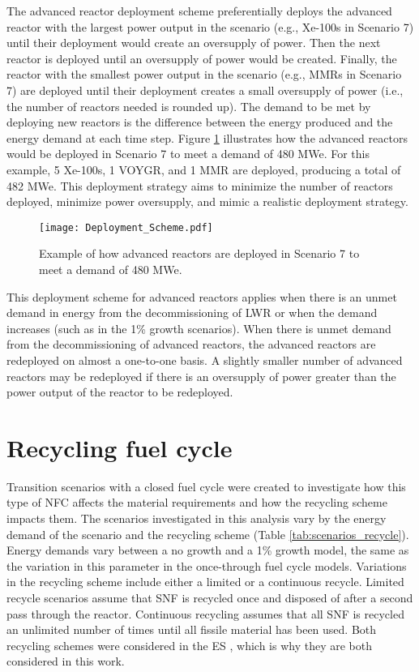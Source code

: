The advanced reactor deployment scheme
preferentially deploys the advanced reactor with the largest power 
output in the scenario (e.g., Xe-100s in Scenario 7) until their 
deployment would create an oversupply of power. Then the next reactor 
is deployed until an oversupply of power would be created. Finally, the 
reactor 
with the smallest power output in the scenario (e.g., \glspl{MMR} in 
Scenario 7) are deployed until their deployment creates a small oversupply 
of power (i.e., the number of reactors needed is rounded up). The demand 
to be met by deploying new reactors is the difference between the energy 
produced and the energy demand at each time step. 
Figure \ref{fig:AR_deployment} illustrates how the advanced reactors 
would be deployed in Scenario 7 to meet a demand of 480 MWe. For this 
example, 5 Xe-100s, 1 VOYGR, and 1 \gls{MMR} are deployed, producing a 
total of 482 MWe. This deployment 
strategy aims to minimize the number of reactors deployed,  
minimize power oversupply, and mimic a realistic deployment strategy.

\begin{figure}[ht]
    \centering
    \texttt{[image: Deployment\_Scheme.pdf]}
    \caption{Example of how advanced reactors are deployed in Scenario 7 
    to meet a demand of 480 MWe.}
    \label{fig:AR_deployment}
\end{figure}

This deployment scheme for advanced reactors applies when there is an 
unmet demand in energy from the decommissioning of \gls{LWR} or 
when the demand increases (such as in the 1\% growth scenarios). When 
there is unmet demand from the decommissioning of advanced reactors, the 
advanced reactors are redeployed on almost a one-to-one basis. A slightly
smaller number of advanced reactors may be redeployed if there is an 
oversupply of power greater than the power output of the reactor to be 
redeployed. 

\section{Recycling fuel cycle}
Transition scenarios with a closed fuel cycle were created
to investigate how this type of \gls{NFC} affects the material requirements 
and how the recycling scheme impacts them. 
The scenarios investigated in this analysis vary by the 
energy demand of the scenario and the recycling scheme (Table 
\ref{tab:scenarios_recycle}). Energy demands vary 
between a no growth and a 1\% growth model, the same as the variation in this 
parameter in the once-through fuel cycle models. Variations in the recycling 
scheme include either a limited or a continuous recycle. Limited recycle 
scenarios assume that \gls{SNF} is recycled once and disposed of after a 
second pass through the reactor. Continuous recycling assumes that all 
\gls{SNF} is recycled an unlimited number of times until all fissile 
material has been used. Both recycling schemes were considered in the 
\acrfull{ES} \cite{wigeland_nuclear_2014}, which is why they are both 
considered in this work.  


